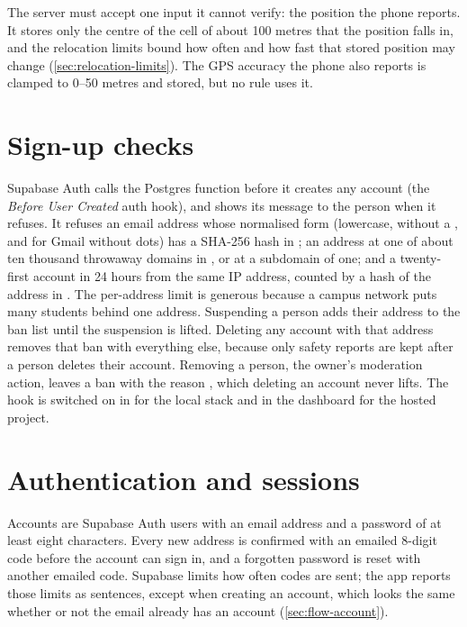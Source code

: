 The server must accept one input it cannot verify: the position the phone reports. It stores only the
centre of the cell of about 100 metres that the position falls in, and the relocation limits bound how
often and how fast that stored position may change (\cref{sec:relocation-limits}). The GPS accuracy the
phone also reports is clamped to 0--50 metres and stored, but no rule uses it.

\section{Sign-up checks}
\label{sec:signup-checks}

Supabase Auth calls the Postgres function  before it creates any
account (the \emph{Before User Created} auth hook), and shows its message to the person when it refuses.
It refuses an email address whose normalised form (lowercase, without a , and for Gmail
without dots) has a SHA-256 hash in ; an address at one of about ten
thousand throwaway domains in , or at a subdomain of one; and a
twenty-first account in 24 hours from the same IP address, counted by a hash of the address in
. The per-address limit is generous because a campus network puts many
students behind one address. Suspending a person adds their address to the ban list until the
suspension is lifted. Deleting any account with that address removes that ban with everything else,
because only safety reports are kept after a person deletes their account. Removing a person, the owner's
moderation action, leaves a ban with the reason , which deleting an account never lifts. The hook is switched on in  for the local
stack and in the dashboard for the hosted project.

\section{Authentication and sessions}

Accounts are Supabase Auth users with an email address and a password of at least eight characters.
Every new address is confirmed with an emailed 8-digit code before the account can sign in, and a
forgotten password is reset with another emailed code. Supabase limits how often codes are sent; the app
reports those limits as sentences, except when creating an account, which looks the same whether or not
the email already has an account (\cref{sec:flow-account}).

